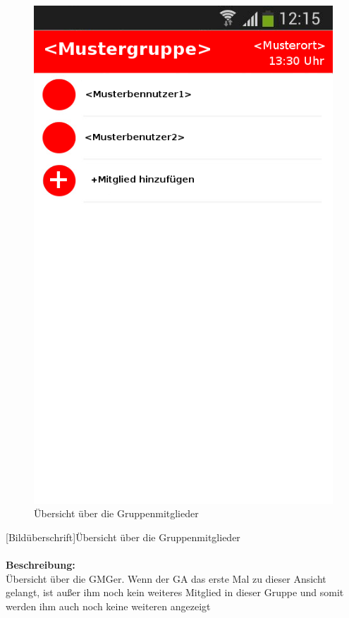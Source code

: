 \begin{figure} [H]
	\caption{Übersicht über die Gruppenmitglieder}
\begin{center}
	\includegraphics[scale =0.5]{resources/images/gruppendetails_Admin.png}
\end{center}
\end{figure}
[Bildüberschrift]Übersicht über die Gruppenmitglieder\\ \\
\textbf{Beschreibung:}\\
Übersicht über die GMGer. Wenn der GA das erste Mal zu dieser Ansicht gelangt, ist außer ihm noch kein weiteres Mitglied in dieser Gruppe und somit werden ihm auch noch keine weiteren angezeigt\\
